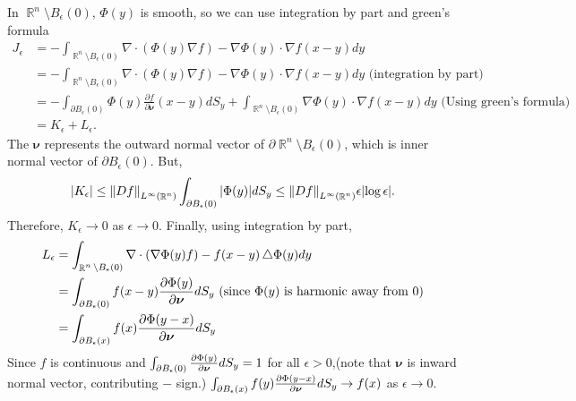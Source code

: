 \documentclass{article}
\DeclareMathOperator{\rr}{\mathbb{R}}
\newcommand*\Laplace{\mathop{}\!\mathbin\bigtriangleup}
\begin{document}
\begin{enumerate}
In $\rr^n\setminus B_\epsilon(0)$, $\Phi(y)$ is smooth, so we can use integration by part and green's formula
\begin{equation*}
\begin{split}
J_\epsilon &=-\int_{\rr^n\setminus B_\epsilon(0)}\nabla\cdot(\Phi(y)\nabla f)-\nabla\Phi(y)\cdot\nabla f(x-y)dy \\
&=-\int_{\rr^n\setminus B_\epsilon(0)}\nabla\cdot(\Phi(y)\nabla f)-\nabla\Phi(y)\cdot\nabla f(x-y)dy \text{ (integration by part)}\\
&=-\int_{\partial B_\epsilon(0)}\Phi(y)\frac{\partial f}{\partial\bm{\nu}}(x-y) dS_y+\int_{\rr^n\setminus B_\epsilon(0)}\nabla\Phi(y)\cdot\nabla f(x-y)dy \text{ (Using green's formula)}\\
&=K_\epsilon+L_\epsilon.
\end{split}
\end{equation*}
The $\bm{\nu}$ represents the outward normal vector of $\partial \rr^n\setminus B_\epsilon(0)$, which is inner normal vector of $\partial B_\epsilon(0)$. But,
\begin{equation*}
\abs{K_\epsilon}\leq \norm{Df}_{L^\infty(\rr^n)}\int_{\partial B_\epsilon(0)}\abs{\Phi(y)}dS_y\leq\norm{Df}_{L^\infty(\rr^n)}\epsilon\abs{\log\epsilon}.
\end{equation*}
Therefore, $K_\epsilon\rightarrow0$ as $\epsilon\rightarrow0$.
Finally, using integration by part,
\begin{equation*}
\begin{split}
L_\epsilon &=\int_{\rr^n\setminus B_\epsilon(0)}\nabla\cdot(\nabla\Phi(y) f)-f(x-y)\Laplace\Phi(y)dy \\
&=\int_{\partial B_\epsilon(0)} f(x-y)\pdv{\Phi(y)}{\bm{\nu}}dS_y \text{ (since }\Phi(y) \text{ is harmonic away from 0)} \\
&=\int_{\partial B_\epsilon(x)} f(x)\pdv{\Phi(y-x)}{\bm{\nu}}dS_y
\end{split}
\end{equation*}
Since $f$ is continuous and $\int_{\partial B_\epsilon(0)} \pdv{\Phi(y)}{\bm{\nu}}dS_y=1$ for all $\epsilon>0$,(note that $\bm{\nu}$ is inward normal vector, contributing $-$ sign.) $\int_{\partial B_\epsilon(x)} f(y)\pdv{\Phi(y-x)}{\bm{\nu}}dS_y\rightarrow f(x)$ as $\epsilon\rightarrow 0$.
\end{enumerate}
\end{document}
